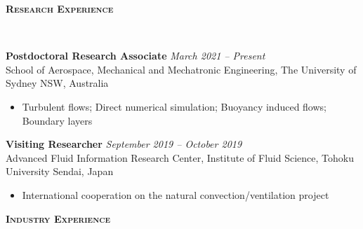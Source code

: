 \documentclass[letterpaper, 10pt]{article}
\newenvironment{changemargin}[2]{%
  \begin{list}{}{%
      \setlength{\topsep}{0pt}%
      \setlength{\leftmargin}{#1}%
      \setlength{\rightmargin}{#2}%
      \setlength{\listparindent}{\parindent}%
      \setlength{\itemindent}{\parindent}%
      \setlength{\parsep}{\parskip}%
    }%
  \item[]}{\end{list}
}
\newcommand{\lineover}{
  \begin{changemargin}{-0.05in}{-0.05in}
    \vspace*{-8pt}
    \hrulefill \\
    \vspace*{-2pt}
  \end{changemargin}
}
\newcommand{\header}[1]{
  \begin{changemargin}{-0.5in}{-0.5in}
    \textbf{\scshape{#1}}\\
    \lineover
  \end{changemargin}
}
\newenvironment{body} {
  \vspace*{-16pt}
  \begin{changemargin}{-0.25in}{-0.5in}
  }
  {\end{changemargin}
}
\begin{document}
\header{Research Experience}
\begin{body}
	\vspace{14pt}
	\textbf{Postdoctoral Research Associate}\hfill
	\emph{March 2021 -- Present} \\
	School of Aerospace, Mechanical and Mechatronic Engineering, The University of Sydney   \hfill NSW, Australia
	\vspace{-2pt}
	\begin{itemize}
		\setlength{\itemindent}{0in}
		\setlength{\itemsep}{0in}
		\item Turbulent flows; Direct numerical simulation; Buoyancy induced flows; Boundary layers 
	\end{itemize}

	\vspace{14pt}
	\textbf{Visiting Researcher}\hfill
	\emph{September 2019 -- October 2019} \\
	Advanced Fluid Information Research Center, Institute of Fluid Science, Tohoku University   \hfill Sendai, Japan
	\vspace{-2pt}
	\begin{itemize}
		\setlength{\itemindent}{0in}
		\setlength{\itemsep}{0in}
		\item International cooperation on the natural convection/ventilation project 
	\end{itemize}

	
\end{body}
\smallskip
\header{Industry Experience}
\end{document}
